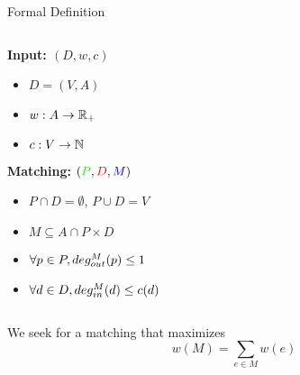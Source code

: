 \begin{frame}[<+->]{Formal Definition}
\begin{columns}

\begin{column}{.45\textwidth}
\textbf{Input: $(D, w, c)$}
\begin{itemize}
\item $D=(V,A)$
\item $w:A \to \mathbb{R}_+$
\item $c:V \to \mathbb{N}$
\end{itemize}

\textbf{Matching:} $({\color{green} P}, {\color{red} D}, {\color{blue} M})$

\begin{itemize}
\item $P \cap D = \emptyset$, $P \cup D = V$
\item $M \subseteq A \cap P \times D$
\item $\forall p \in P, deg^M_{out}(p) \leq 1$
\item $\forall d \in D, deg^M_{in}(d) \leq c(d)$
\end{itemize}
\end{column}

\begin{column}{.55\textwidth}
\centering

\end{column}
\end{columns}

\vfill
We seek for a matching that maximizes
$$w(M) = \sum_{e \in M}{w(e)}$$

\end{frame}